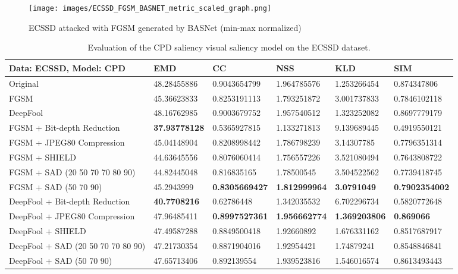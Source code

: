 \documentclass[10pt,twocolumn,letterpaper]{article}
\begin{document}
\begin{figure*}[hbt]
    \centering
    \texttt{[image: images/ECSSD\_FGSM\_BASNET\_metric\_scaled\_graph.png]}
    \caption{ECSSD \cite{ECSSD} attacked with FGSM \cite{FGSM} generated by BASNet \cite{BASNet} (min-max normalized) }
    \label{fig:ecssd_fgsm_basnet_metric_graph}
\end{figure*}

\begin{table*}[hbt]
\begin{tabular}{l|l|l|l|l|l}
Data: \textbf{ECSSD}, Model: \textbf{CPD}  & EMD    & CC  & NSS  & KLD  & SIM  \\
\hline
Original                          & 48.28455886 & 0.9043654799 & 1.964785576 & 1.253266454 & 0.874347806  \\
\hline
FGSM                           & 45.36623833 & 0.8253191113 & 1.793251872 & 3.001737833 & 0.7846102118 \\
DeepFool                       & 48.16762985 & 0.9003679752 & 1.957540512 & 1.323252082 & 0.8697779179 \\
\hline
FGSM + Bit-depth Reduction     & \textbf{37.93778128} & 0.5365927815 & 1.133271813 & 9.139689445 & 0.4919550121 \\
FGSM + JPEG80 Compression      & 45.04148904 & 0.8208998442 & 1.786798239 & 3.14307785  & 0.7796351314 \\
FGSM + SHIELD                  & 44.63645556 & 0.8076060414 & 1.756557226 & 3.521080494 & 0.7643808722 \\
FGSM + SAD (20 50 70 70 80 90)            & 44.82445048 & 0.816835165  & 1.78500545  & 3.504522562 & 0.7739418745 \\
FGSM + SAD (50 70 90)            & 45.2943999  & \textbf{0.8305669427} & \textbf{1.812999964} & \textbf{3.0791049} & \textbf{0.7902354002} \\
\hline
DeepFool + Bit-depth Reduction & \textbf{40.7708216}  & 0.62786448   & 1.342035532 & 6.702296734 & 0.5820772648 \\
DeepFool + JPEG80 Compression  & 47.96485411 & \textbf{0.8997527361} & \textbf{1.956662774} & \textbf{1.369203806} & \textbf{0.869066}     \\
DeepFool + SHIELD              & 47.49587288 & 0.8849500418 & 1.92660892  & 1.676331162 & 0.8517687917 \\
DeepFool + SAD (20 50 70 70 80 90)        & 47.21730354 & 0.8871904016 & 1.92954421  & 1.74879241  & 0.8548846841 \\
DeepFool + SAD (50 70 90)       & 47.65713406 & 0.892139554  & 1.939523816 & 1.546016574 & 0.8613493443
\end{tabular}
  \caption{Evaluation of the CPD\cite{wu2019cascaded} saliency visual saliency model\cite{wu2019cascaded} on the ECSSD\cite{ECSSD} dataset.}
  \label{table:results_ecssd_cpd}
\end{table*}
\end{document}
